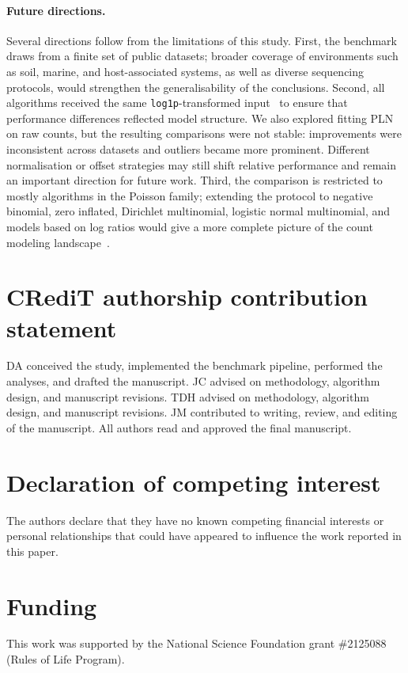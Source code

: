 \documentclass[USenglish]{article}
\theoremstyle{dgthm}
\begin{document}
\paragraph{Future directions.}
Several directions follow from the limitations of this study.
First, the benchmark draws from a finite set of public datasets; broader coverage of environments such as soil, marine, and host-associated systems, as well as diverse sequencing protocols, would strengthen the generalisability of the conclusions.
Second, all algorithms received the same \texttt{log1p}-transformed input~\citep{doi:10.1128/mSystems.00016-19} to ensure that performance differences reflected model structure.
We also explored fitting PLN on raw counts, but the resulting comparisons were not stable: improvements were inconsistent across datasets and outliers became more prominent.
Different normalisation or offset strategies may still shift relative performance and remain an important direction for future work.
Third, the comparison is restricted to mostly algorithms in the Poisson family; extending the protocol to negative binomial, zero inflated, Dirichlet multinomial, logistic normal multinomial, and models based on log ratios would give a more complete picture of the count modeling landscape~\citep{10.1038/s41598-024-76513-8,10.1101/538579,10.1093/bioadv/vbae167,Champion2024OneNet,Gloor2017Compositional,Tsilimigras2016Compositional}.

\section*{CRediT authorship contribution statement}
DA conceived the study, implemented the benchmark pipeline, performed the analyses, and drafted the manuscript.
JC advised on methodology, algorithm design, and manuscript revisions.
TDH advised on methodology, algorithm design, and manuscript revisions.
JM contributed to writing, review, and editing of the manuscript.
All authors read and approved the final manuscript.

\section*{Declaration of competing interest}
The authors declare that they have no known competing financial interests or personal relationships that could have appeared to influence the work reported in this paper.

\section*{Funding}
This work was supported by the National Science Foundation grant \#2125088 (Rules of Life Program).
\end{document}
